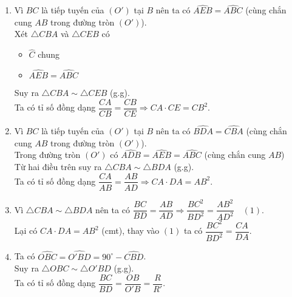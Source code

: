 \begin{bt}
{		
		\begin{enumerate}
			\item Vì $BC$ là tiếp tuyến của $(O')$ tại $B$ nên ta có $\widehat{AEB}=\widehat{ABC}$ (cùng chắn cung $AB$ trong đường tròn $(O')$).\\
			Xét $\triangle CBA$ và $\triangle CEB$ có 
			\begin{itemize}
				\item $\widehat{C}$ chung
				\item $\widehat{AEB}=\widehat{ABC}$
			\end{itemize}
			Suy ra $\triangle CBA \sim \triangle CEB$ (g.g).\\
			Ta có tỉ số đồng dạng $\dfrac{CA}{CB}=\dfrac{CB}{CE} \Rightarrow CA \cdot CE=CB^2.$
			\item Vì $BC$ là tiếp tuyến của $(O')$ tại $B$ nên ta có $\widehat{BDA}=\widehat{CBA}$ (cùng chắn cung $AB$ trong đường tròn $(O')$).\\
			Trong đường tròn $(O')$ có $\widehat{ADB}=\widehat{AEB}=\widehat{ABC}$ (cùng chắn cung $AB$)\\
			Từ hai điều trên suy ra $\triangle CBA \sim \triangle BDA$ (g.g).\\
			Ta có tỉ số đồng dạng $\dfrac{CA}{AB}=\dfrac{AB}{AD} \Rightarrow CA \cdot DA=AB^2.$
			\item Vì $\triangle CBA \sim \triangle BDA$ nên ta có $\dfrac{BC}{BD}=\dfrac{AB}{AD} \Rightarrow \dfrac{BC^2}{BD^2}=\dfrac{AB^2}{AD^2} \quad(1)$.\\
			Lại có $CA \cdot DA=AB^2$ (cmt), thay vào $(1)$ ta có $\dfrac{BC^2}{BD^2}=\dfrac{CA}{DA}$.
			\item Ta có $\widehat{OBC}=\widehat{O'BD}=90^{\circ}-\widehat{CBD}$.\\
			Suy ra $\triangle OBC \sim \triangle O'BD$ (g.g).\\
			Ta có tỉ số đồng dạng $\dfrac{BC}{BD}=\dfrac{OB}{O'B}=\dfrac{R}{R'}.$
		\end{enumerate}
	}
\end{bt}

